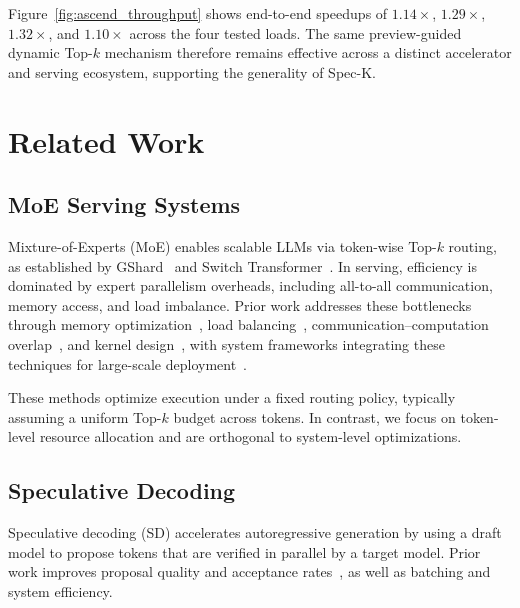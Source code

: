 \documentclass[conference]{IEEEtran}
\theoremstyle{definition} %
\begin{document}
Figure~\ref{fig:ascend_throughput} shows end-to-end speedups of $1.14\times$, $1.29\times$, $1.32\times$, and $1.10\times$ across the four tested loads. The same preview-guided dynamic Top-$k$ mechanism therefore remains effective across a distinct accelerator and serving ecosystem, supporting the generality of Spec-K.


\section{Related Work}

\subsection{MoE Serving Systems}

Mixture-of-Experts (MoE) enables scalable LLMs via token-wise Top-$k$ routing, as established by GShard~\cite{lepikhin2020gshard} and Switch Transformer~\cite{fedus2022switch}. 
In serving, efficiency is dominated by expert parallelism overheads, including all-to-all communication, memory access, and load imbalance. 
Prior work addresses these bottlenecks through memory optimization~\cite{chen2025ktransformers,zhong2024adapmoe}, load balancing~\cite{deepseekai2025eplb,deepseek2025lplb}, communication--computation overlap~\cite{he2022fastermoe,liu2024deepseek}, and kernel design~\cite{gale2023megablocks}, with system frameworks integrating these techniques for large-scale deployment~\cite{rajbhandari2022deepspeed,li2023accelerating,hwang2023tutel,yuan2025x,kwon2023efficient,zheng2024sglang}.

These methods optimize execution under a fixed routing policy, typically assuming a uniform Top-$k$ budget across tokens. 
In contrast, we focus on token-level resource allocation and are orthogonal to system-level optimizations.

\subsection{Speculative Decoding}

Speculative decoding (SD) accelerates autoregressive generation by using a draft model to propose tokens that are verified in parallel by a target model. 
Prior work improves proposal quality and acceptance rates~\cite{stern2018blockwise,chen2023spec,leviathan2023spec,cai2024medusa,li2024eagle,miao2024specinfer,he2024rest,spector2023accelerating}, as well as batching and system efficiency.
\end{document}
